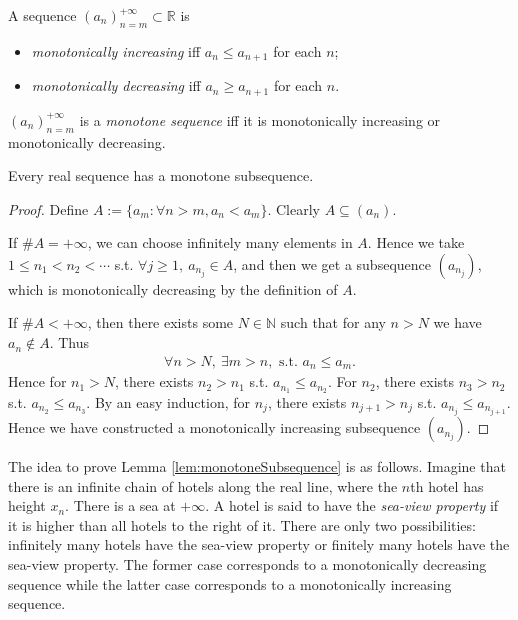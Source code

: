 \begin{defn}
  \label{defn:monotoneSequences}
  A sequence $(a_n)_{n=m}^{+\infty} \subset \mathbb{R}$ is
  \begin{itemize}\itemsep0em
  \item \emph{monotonically increasing} iff
    $a_n\le a_{n+1}$ for each $n$; 
  \item \emph{monotonically decreasing} iff
    $a_n\ge a_{n+1}$ for each $n$. 
  \end{itemize}
  $(a_n)_{n=m}^{+\infty}$ is a \emph{monotone sequence}
  iff it is monotonically increasing or monotonically decreasing.
\end{defn}

\begin{lem}
  \label{lem:monotoneSubsequence}
  Every real sequence has a monotone subsequence.
\end{lem}
\begin{proof}
  Define $A:=\{a_{m}: 
  \forall n>m, a_{n}<a_{m}\}$. Clearly $A\subseteq (a_{n})$.

  If $\#A=+\infty$, we can choose infinitely many elements in $A$.
  Hence we take $1\le n_{1}<n_{2}<\cdots$ s.t.
  $\forall j\ge 1,\ a_{n_{j}}\in A$, 
  and then we get a subsequence $(a_{n_{j}})$,
  which is monotonically decreasing by the definition of $A$.

  If $\#A<+\infty$, then there exists some $N\in \mathbb{N}$ such that
  for any $n>N$ we have $a_{n}\notin A$. Thus
  \begin{align*}
    \forall n>N,\ \exists m>n,\text{ s.t. } a_{n}\le a_{m}.
  \end{align*}
  Hence for $n_{1}>N$, there exists $n_{2}>n_{1}$ s.t.
  $a_{n_{1}}\le a_{n_{2}}$. For $n_{2}$, there exists $n_{3}>n_{2}$ s.t.
  $a_{n_{2}}\le a_{n_{3}}$. By an easy induction, for $n_{j}$,
  there exists $n_{j+1}>n_{j}$ s.t. $a_{n_{j}}\le a_{n_{j+1}}$.
  Hence we have constructed a monotonically increasing subsequence
  $(a_{n_{j}})$.
\end{proof}

\begin{rem}
  The idea to prove Lemma \ref{lem:monotoneSubsequence} is as follows.
  Imagine that there is an infinite chain of hotels
  along the real line,
  where the $n$th hotel has height $x_n$.
  There is a sea at $+\infty$.
  A hotel is said to have the \emph{sea-view property}
  if it is higher than all hotels to the right of it.
  There are only two possibilities:
  infinitely many hotels have the sea-view property
  or finitely many hotels have the sea-view property.
  The former case corresponds to a monotonically decreasing sequence
  while
  the latter case corresponds to a monotonically increasing sequence.
\end{rem}

